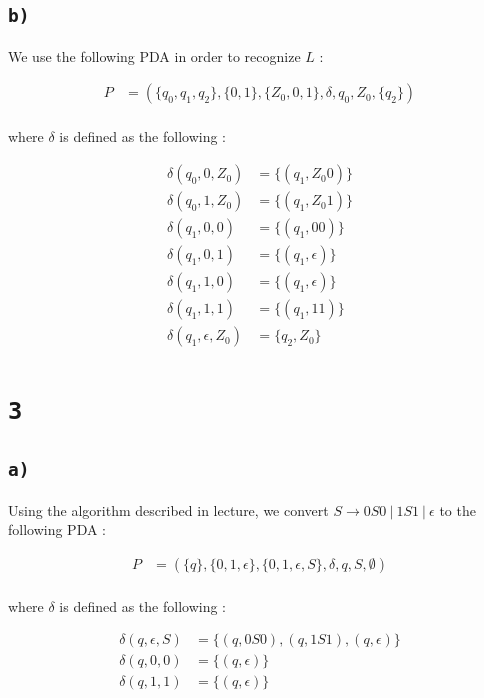 \documentclass[a4paper,11pt]{report}
\begin{document}
\subsection*{\texttt{b)}}

We use the following PDA in order to recognize $L$ :

\begin{align*}
  P &= (\{q_0,q_1,q_2\},\{0,1\},\{Z_0,0,1\},\delta,q_0,Z_0,\{q_2\}) \\
\end{align*}

where $\delta$ is defined as the following :

\begin{align*}
  \delta(q_0,0,Z_0) &= \{(q_1,Z_0 0)\} \\
  \delta(q_0,1,Z_0) &= \{(q_1,Z_0 1)\} \\
  \delta(q_1,0, 0) &= \{(q_1,00)\} \\
  \delta(q_1,0, 1) &= \{(q_1,\epsilon)\} \\
  \delta(q_1,1, 0) &= \{(q_1,\epsilon)\} \\
  \delta(q_1,1, 1) &= \{(q_1,11)\} \\
  \delta(q_1,\epsilon,Z_0) &= \{q_2,Z_0\} \\
\end{align*}

\section*{\texttt{3}}

\subsection*{\texttt{a)}}

Using the algorithm described in lecture, we convert $S \to 0S0\ |\ 1S1\ |\
\epsilon$ to the following PDA :

\begin{align*}
  P &= (\{q\},\{0,1,\epsilon\},\{0,1,\epsilon,S\},\delta,q,S,\emptyset) \\
\end{align*}

where $\delta$ is defined as the following :

\begin{align*}
  \delta(q,\epsilon,S) &= \{(q,0S0),(q,1S1),(q,\epsilon)\} \\
  \delta(q,0,0) &= \{(q,\epsilon)\} \\
  \delta(q,1,1) &= \{(q,\epsilon)\} \\
\end{align*}
\end{document}
